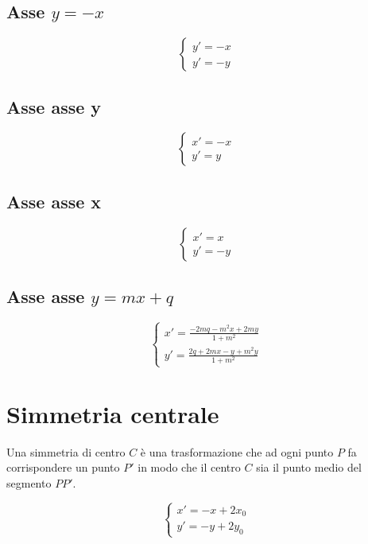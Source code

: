 \subsection{Asse $y=-x$}
\begin{tcolorbox}[sidebyside,righthand width=7cm,colback=white,colframe=white,fonttitle=\bfseries	]
	\[\begin{cases}
	y'=-x\\
	y'=-y
	\end{cases}
	\]
	\tcblower
	
\end{tcolorbox}
\subsection{Asse asse y}
\begin{tcolorbox}[sidebyside,righthand width=7cm,colback=white,colframe=white,fonttitle=\bfseries	]
	\[\begin{cases}
	x'=-x\\
	y'=y
	\end{cases}
	\]
	\tcblower
		
\end{tcolorbox}
\subsection{Asse asse x}
\begin{tcolorbox}[sidebyside,righthand width=7cm,colback=white,colframe=white,fonttitle=\bfseries	]
	\[\begin{cases}
	x'=x\\
	y'=-y
	\end{cases}
	\]
	\tcblower
	
\end{tcolorbox}
\subsection{Asse asse $y=mx+q$}
\begin{tcolorbox}[sidebyside,righthand width=7cm,colback=white,colframe=white,fonttitle=\bfseries	]
	\[\begin{cases}
	x'=\frac{-2mq-m^2x+2my}{1+m^2}\\
	y'=\frac{2q+2mx-y+m^2y}{1+m^2}
	\end{cases}
	\]
	\tcblower
	
\end{tcolorbox}
\section{Simmetria centrale}
Una simmetria di centro $C$ è una trasformazione che ad ogni punto $P$ fa corrispondere un punto $P'$ in modo che il centro $C$ sia il punto medio del segmento $PP'$.
\begin{tcolorbox}[sidebyside,righthand width=7cm,colback=white,colframe=white,fonttitle=\bfseries	]
	\[\begin{cases}
	x'=-x+2x_0\\
	y'=-y+2y_0
	\end{cases}
	\]
	\tcblower
	
\end{tcolorbox}